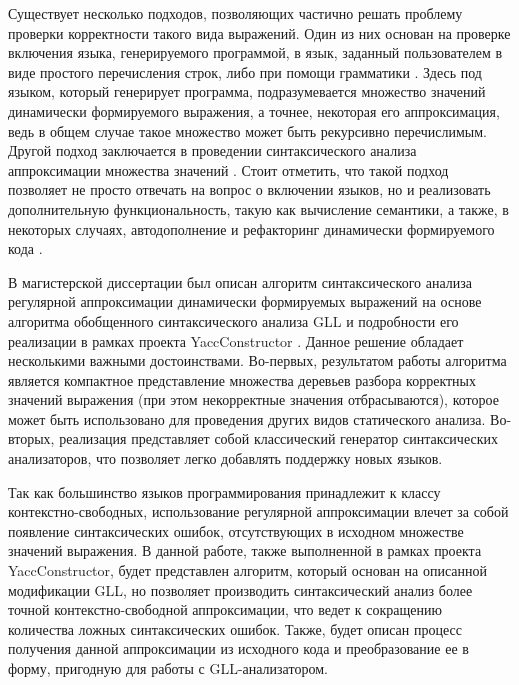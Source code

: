 \documentclass[14pt]{matmex-diploma-custom}
\begin{document}
Существует несколько подходов, позволяющих частично решать проблему проверки корректности такого вида выражений. Один из них основан на проверке включения языка, генерируемого программой, в язык, заданный пользователем в виде простого перечисления строк, либо при помощи грамматики \cite{jsa, phpsa}. Здесь под языком, который генерирует программа, подразумевается множество значений динамически формируемого выражения, а точнее, некоторая его аппроксимация, ведь в общем случае такое множество может быть рекурсивно перечислимым. Другой подход заключается в проведении синтаксического анализа аппроксимации множества значений \cite{alvor, a_lr}. Стоит отметить, что такой подход позволяет не просто отвечать на вопрос о включении языков, но и реализовать дополнительную функциональность, такую как вычисление семантики, а также, в некоторых случаях, автодополнение и рефакторинг динамически формируемого кода \cite{varis}.

В магистерской диссертации \cite{nastya} был описан алгоритм синтаксического анализа регулярной аппроксимации динамически формируемых выражений на основе алгоритма обобщенного синтаксического анализа GLL \cite{gll} и подробности его реализации в рамках проекта YaccConstructor \cite{yc}. Данное решение обладает несколькими важными достоинствами. Во-первых, результатом работы алгоритма является компактное представление множества деревьев разбора корректных значений выражения (при этом некорректные значения отбрасываются), которое может быть использовано для проведения других видов статического анализа. Во-вторых, реализация представляет собой классический генератор синтаксических анализаторов, что позволяет легко добавлять поддержку новых языков.

Так как большинство языков программирования принадлежит к классу контекстно-свободных, использование регулярной аппроксимации влечет за собой появление синтаксических ошибок, отсутствующих в исходном множестве значений выражения. В данной работе, также выполненной в рамках проекта YaccConstructor, будет представлен алгоритм, который основан на описанной модификации GLL, но позволяет производить синтаксический анализ более точной контекстно-свободной аппроксимации, что ведет к сокращению количества ложных синтаксических ошибок. Также, будет описан процесс получения данной аппроксимации из исходного кода и преобразование ее в форму, пригодную для работы с GLL-анализатором.
\end{document}
